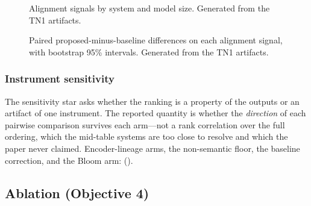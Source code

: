 \begin{figure}[t]
  \centering
  \caption{Alignment signals by system and model size. Generated from the TN1
  artifacts.}
  \label{fig:rq2-components}
\end{figure}

\begin{figure}[t]
  \centering
  \caption{Paired proposed-minus-baseline differences on each alignment signal, with
  bootstrap 95\% intervals. Generated from the TN1 artifacts.}
  \label{fig:rq2-forest}
\end{figure}

\subsubsection{Instrument sensitivity}
\label{sec:sensitivity}

The sensitivity star asks whether the ranking is a property of the outputs or an
artifact of one instrument. The reported quantity is whether the \emph{direction} of
each pairwise comparison survives each arm---not a rank correlation over the full
ordering, which the mid-table systems are too close to resolve and which the paper
never claimed. Encoder-lineage arms, the non-semantic floor, the baseline
correction, and the Bloom arm: \TBD{} ().

\begin{table}[t]
  \caption{Agreement of each sensitivity arm with the primary configuration.
  Generated from the TN1 artifacts.}
  \label{tab:rq2-sensitivity}
  \small
  \centering
\end{table}

\subsection{Ablation (Objective 4)}
\label{sec:ablation}

